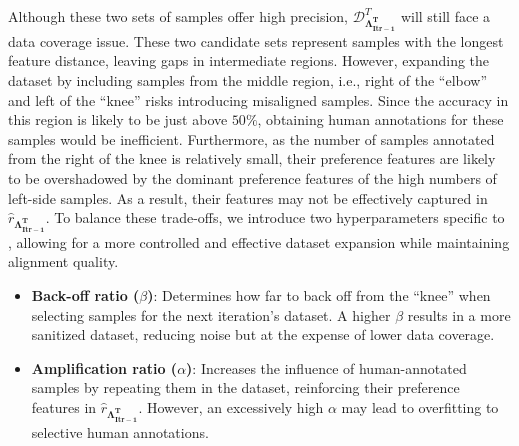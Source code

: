 Although these two sets of samples offer high precision, $\mathcal{D}_{\mathbf{\Lambda_{Itr-1}^{T}}}^{T}$ will still face a data coverage issue. These two candidate sets represent samples with the longest feature distance, leaving gaps in intermediate regions. However, expanding the dataset by including samples from the middle region, i.e., right of the ``elbow'' and left of the ``knee'' risks introducing misaligned samples. Since the accuracy in this region is likely to be just above $50\%$, obtaining human annotations for these samples would be inefficient. 
Furthermore, as the number of samples annotated from the right of the knee is relatively small, their preference features are likely to be overshadowed by the dominant preference features of the high numbers of left-side samples. As a result, their features may not be effectively captured in $\hat{r}_\mathbf{\Lambda_{Itr-1}^{T}}$. To balance these trade-offs, we introduce two hyperparameters specific to \myname{}, allowing for a more controlled and effective dataset expansion while maintaining alignment quality.

\begin{itemize}[leftmargin=*,topsep=2pt]
    \item \textbf{Back-off ratio ($\beta$)}: Determines how far to back off from the ``knee'' when selecting samples for the next iteration's dataset. A higher $\beta$ results in a more sanitized dataset, reducing noise but at the expense of lower data coverage.  
    \item \textbf{Amplification ratio ($\alpha$)}: Increases the influence of human-annotated samples by repeating them in the dataset, reinforcing their preference features in $\hat{r}_\mathbf{\Lambda_{Itr-1}^{T}}$. However, an excessively high $\alpha$ may lead to overfitting to selective human annotations.
\end{itemize}

